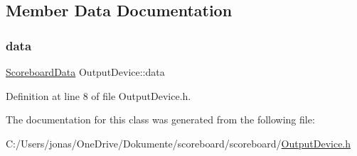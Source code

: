 \subsection{Member Data Documentation}
\mbox{\label{class_output_device_a72865c0b4546f1e80762d1bd53e2a065}} 
\subsubsection{\texorpdfstring{data}{data}}
{\footnotesize\ttfamily \hyperlink{struct_scoreboard_data}{Scoreboard\+Data} Output\+Device\+::data\hspace{0.3cm}{\ttfamily [protected]}}



Definition at line 8 of file Output\+Device.\+h.



The documentation for this class was generated from the following file\+:\begin{DoxyCompactItemize}
\item 
C\+:/\+Users/jonas/\+One\+Drive/\+Dokumente/scoreboard/scoreboard/\hyperlink{_output_device_8h}{Output\+Device.\+h}\end{DoxyCompactItemize}
